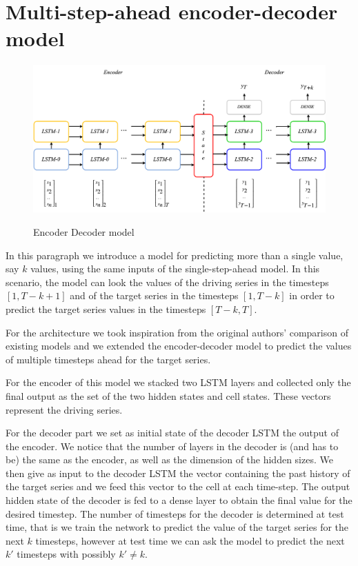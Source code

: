 \documentclass{article}
\begin{document}
\section{Multi-step-ahead encoder-decoder model}

\begin{figure}[ht]
\centering
\includegraphics[width=0.9\linewidth]{ende-rnn.png} \\
\caption{Encoder Decoder model}
\label{fig:ende-rnn}
\end{figure}


In this paragraph we introduce a model for predicting more than a single value,
say $k$ values, using the same inputs of the single-step-ahead model.
In this scenario, the model can look the values of the driving series
in the timesteps $[1, T - k + 1]$ and of the
target series in the timesteps $[1, T - k]$ in order to predict the target
series values in the timesteps $[T - k, T]$.

For the architecture we took inspiration from the original authors' comparison
of
existing models and we extended the encoder-decoder model to predict the values
of multiple timesteps ahead for the target series.

For the encoder of this model we stacked two LSTM layers and collected only the
final output as the set of the two hidden states and cell states. These vectors
represent the driving series.

For the decoder part we set as initial state of the decoder LSTM the output of
the
encoder. We notice that the number of layers in the decoder is (and has to be)
the
same as the encoder, as well as the dimension of the hidden sizes. We then give
as
input to the decoder LSTM the vector containing the past history of the target
series and we feed this vector to the cell at each time-step. The output hidden
state of the decoder is fed to a dense layer to obtain the final value for the
desired timestep. The number of timesteps for the decoder is determined at test
time, that is we train the network to predict the value of the target series for
the next $k$ timesteps, however at test time we can ask the model to predict
the
next $k'$ timesteps with possibly $k' \ne k$.
\end{document}
